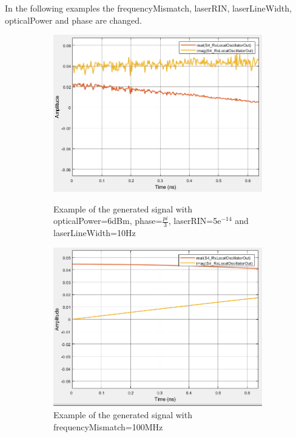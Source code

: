 In the following examples the frequencyMismatch, laserRIN, laserLineWidth, opticalPower and phase are changed.
\begin{figure}[H]
	\centering
        \begin{subfigure}{.55\textwidth}
        \centering
        	\includegraphics[scale=0.45]{./lib/local_oscillator/Figures/Tudo_100Mhz_10_pi_3_5e-14.png}
        \label{Example_All}\caption{Example of the generated signal with opticalPower=6dBm, phase=$\frac{pi}{3}$, laserRIN=5e$^{-14}$ and laserLineWidth=10Hz}
        \end{subfigure}%
        \begin{subfigure}{.55\textwidth}
        \centering
        	\includegraphics[scale=0.45]{./lib/local_oscillator/Figures/FrequencyMismatch_100MHz.png}
        	\caption{Example of the generated signal with frequencyMismatch=100MHz}\label{Example_FrequencyMismatch}
        \end{subfigure}
        \caption{}\label{Example_1}
\end{figure}

